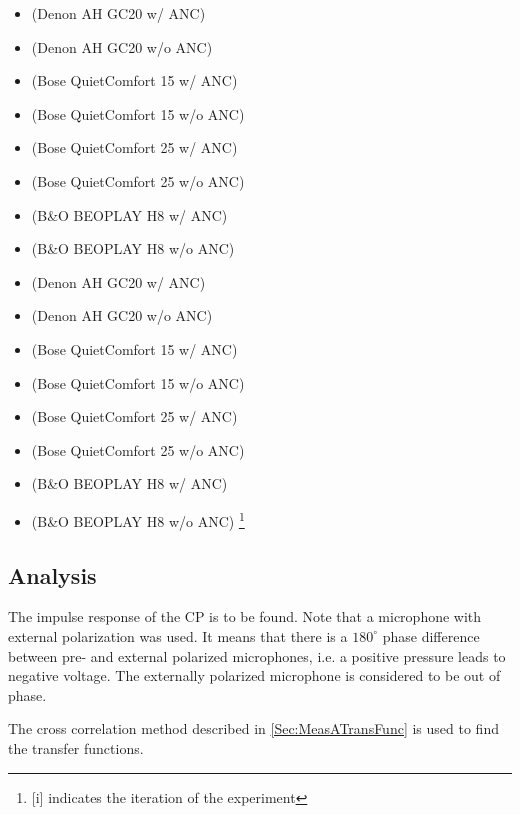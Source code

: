\begin{itemize}
	\item {}			(Denon AH GC20 w/ ANC)
	\item {}		(Denon AH GC20 w/o ANC)
	\item {}		(Bose QuietComfort 15 w/ ANC)
	\item {}		(Bose QuietComfort 15 w/o ANC)
	\item {}		(Bose QuietComfort 25 w/ ANC)
	\item {}		(Bose QuietComfort 25 w/o ANC)
	\item {}			(B\&O BEOPLAY H8 w/ ANC)
	\item {}			(B\&O BEOPLAY H8 w/o ANC)
	\item {}		(Denon AH GC20 w/ ANC)
	\item {}		(Denon AH GC20 w/o ANC)
	\item {}		(Bose QuietComfort 15 w/ ANC)
	\item {}		(Bose QuietComfort 15 w/o ANC)
	\item {}		(Bose QuietComfort 25 w/ ANC)
	\item {}		(Bose QuietComfort 25 w/o ANC)
	\item {}			(B\&O BEOPLAY H8 w/ ANC)
	\item {}		(B\&O BEOPLAY H8 w/o ANC)
	\footnote{[i] indicates the iteration of the experiment}
\end{itemize}


\subsection{Analysis}
The impulse response of the CP is to be found.
Note that a microphone with external polarization was used. It means that there is a $180^\circ$ phase difference between pre- and external polarized microphones, i.e. a positive pressure leads to negative voltage. The externally polarized microphone is considered to be out of phase. \cite{michandbook}

The cross correlation method described in \autoref{Sec:MeasATransFunc} is used to find the transfer functions. 

